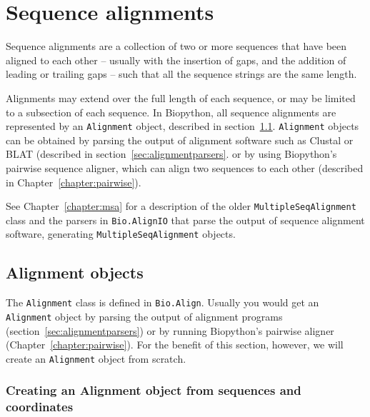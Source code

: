 \chapter{Sequence alignments}
\label{chapter:align}

Sequence alignments are a collection of two or more sequences that have been aligned to each other -- usually with the insertion of gaps, and the addition of leading or trailing gaps -- such that all the sequence strings are the same length.

Alignments may extend over the full length of each sequence, or may be limited to a subsection of each sequence. In Biopython, all sequence alignments are represented by an \verb|Alignment| object, described in section~\ref{sec:alignmentobject}. \verb|Alignment| objects can be obtained by parsing the output of alignment software such as Clustal or BLAT (described in section~\ref{sec:alignmentparsers}. or by using Biopython's pairwise sequence aligner, which can align two sequences to each other (described in Chapter~\ref{chapter:pairwise}).

See Chapter~\ref{chapter:msa} for a description of the older \verb|MultipleSeqAlignment| class and the parsers in \verb|Bio.AlignIO| that parse the output of sequence alignment software, generating \verb|MultipleSeqAlignment| objects.

\section{Alignment objects}
\label{sec:alignmentobject}

The \verb|Alignment| class is defined in \verb|Bio.Align|. Usually you would get an \verb|Alignment| object by parsing the output of alignment programs (section~\ref{sec:alignmentparsers}) or by running Biopython's pairwise aligner (Chapter~\ref{chapter:pairwise}). For the benefit of this section, however, we will create an \verb|Alignment| object from scratch.

\subsection{Creating an Alignment object from sequences and coordinates}
\label{subsec:align_sequences_coordinates}

